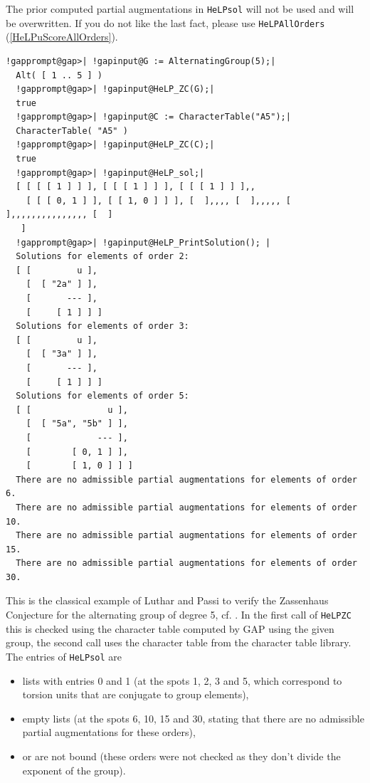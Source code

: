 \documentclass[a4paper,11pt]{report}
\begin{document}
{{{ The prior computed partial augmentations in \texttt{HeLP{\textunderscore}sol} will not be used and will be overwritten. If you do not like the last fact,
please use \texttt{HeLP{\textunderscore}AllOrders} (\ref{HeLPuScoreAllOrders}). }

 
\begin{Verbatim}[commandchars=!@|,fontsize=\small,frame=single,label=Example]
  !gapprompt@gap>| !gapinput@G := AlternatingGroup(5);|
  Alt( [ 1 .. 5 ] )
  !gapprompt@gap>| !gapinput@HeLP_ZC(G);|
  true
  !gapprompt@gap>| !gapinput@C := CharacterTable("A5");|
  CharacterTable( "A5" )
  !gapprompt@gap>| !gapinput@HeLP_ZC(C);|
  true
  !gapprompt@gap>| !gapinput@HeLP_sol;|
  [ [ [ [ 1 ] ] ], [ [ [ 1 ] ] ], [ [ [ 1 ] ] ],, 
    [ [ [ 0, 1 ] ], [ [ 1, 0 ] ] ], [  ],,,, [  ],,,,, [  ],,,,,,,,,,,,,,, [  ] 
   ]
  !gapprompt@gap>| !gapinput@HeLP_PrintSolution(); |
  Solutions for elements of order 2:
  [ [         u ],
    [  [ "2a" ] ],
    [       --- ],
    [     [ 1 ] ] ]
  Solutions for elements of order 3:
  [ [         u ],
    [  [ "3a" ] ],
    [       --- ],
    [     [ 1 ] ] ]
  Solutions for elements of order 5:
  [ [               u ],
    [  [ "5a", "5b" ] ],
    [             --- ],
    [        [ 0, 1 ] ],
    [        [ 1, 0 ] ] ]
  There are no admissible partial augmentations for elements of order 6.
  There are no admissible partial augmentations for elements of order 10.
  There are no admissible partial augmentations for elements of order 15.
  There are no admissible partial augmentations for elements of order 30.
\end{Verbatim}
 This is the classical example of Luthar and Passi to verify the Zassenhaus
Conjecture for the alternating group of degree 5, cf. \cite{LP}. In the first call of \texttt{HeLP{\textunderscore}ZC} this is checked using the character table computed by GAP using the given
group, the second call uses the character table from the character table
library. The entries of \texttt{HeLP{\textunderscore}sol} are 
\begin{itemize}
\item  lists with entries 0 and 1 (at the spots 1, 2, 3 and 5, which correspond to
torsion units that are conjugate to group elements), 
\item  empty lists (at the spots 6, 10, 15 and 30, stating that there are no
admissible partial augmentations for these orders), 
\item  or are not bound (these orders were not checked as they don't divide the
exponent of the group). 
\end{itemize}
 

}}
\end{document}
